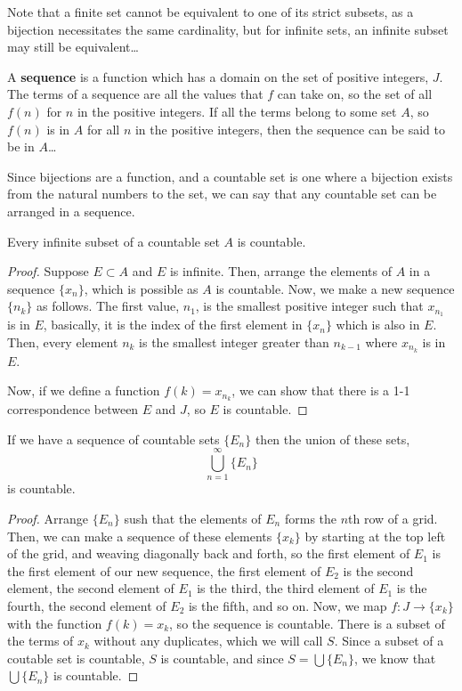\documentclass{article}
\begin{document}
Note that a finite set cannot be equivalent to one of its strict subsets, as a bijection necessitates the same cardinality, but for infinite sets, an infinite subset may still be equivalent\dots

\begin{definition}[Sequences]
	A \textbf{sequence} is a function which has a domain on the set of positive integers, $J$. The terms of a sequence are all the values that $f$ can take on, so the set of all $f(n)$ for $n$ in the positive integers. If all the terms belong to some set $A$, so $f(n)$ is in $A$ for all $n$ in the positive integers, then the sequence can be said to be in $A$\dots
\end{definition}

Since bijections are a function, and a countable set is one where a bijection exists from the natural numbers to the set, we can say that any countable set can be arranged in a sequence.

\begin{theorem}
Every infinite subset of a countable set $A$ is countable.
\end{theorem}

\begin{proof}
		Suppose $E \subset A$ and $E$ is infinite. Then, arrange the elements of $A$ in a sequence $\{x_n\}$, which is possible as $A$ is countable. Now, we make a new sequence $\{n_k\}$ as follows. The first value, $n_1$, is the smallest positive integer such that $x_n_1$ is in $E$, basically, it is the index of the first element in $\{x_n\}$ which is also in $E$. Then, every element $n_k$ is the smallest integer greater than $n_{k-1}$ where $x_n_k$ is in $E$.

		Now, if we define a function $f(k) = x_n_k$, we can show that there is a 1-1 correspondence between $E$ and $J$, so $E$ is countable.
		\end{proof}

		\begin{theorem}

			If we have a sequence of countable sets $\{E_n\}$ then the union of these sets, $$\bigcup_{n=1}^{\infty} \{E_n\}$$is countable.
		\end{theorem}
			\begin{proof}

				Arrange $\{E_n\}$ sush that the elements of $E_n$ forms the $n$th row of a grid. Then, we can make a sequence of these elements $\{x_k\}$ by starting at the top left of the grid, and weaving diagonally back and forth, so the first element of $E_1$ is the first element of our new sequence, the first element of $E_2$ is the second element, the second element of $E_1$ is the third, the third element of $E_1$ is the fourth, the second element of $E_2$ is the fifth, and so on. Now, we map $f: J \to \{x_k\}$ with the function $f(k) = x_k$, so the sequence is countable. There is a subset of the terms of $x_k$ without any duplicates, which we will call $S$. Since a subset of a coutable set is countable, $S$ is countable, and since $S = \bigcup \{E_n\}$, we know that $\bigcup \{E_n\}$ is countable.
		\end{proof}
\end{document}
